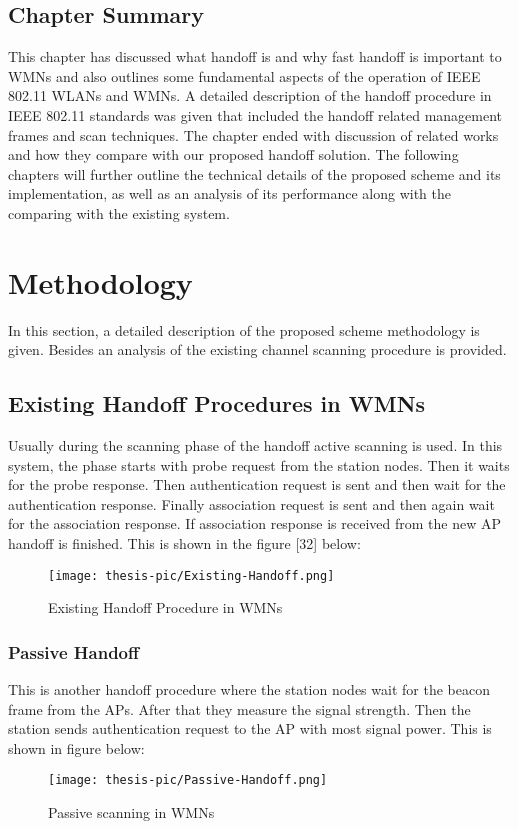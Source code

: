 \documentclass[12pt,a4paper]{report}
\begin{document}
\section{Chapter Summary}
This chapter has discussed what handoff is and why fast handoff is important to WMNs and also outlines some fundamental aspects of the operation of IEEE 802.11 WLANs and WMNs. A detailed description of the handoff procedure in IEEE 802.11 standards was given that included the handoff related management frames and scan techniques. The chapter ended with discussion of related works and how they compare with our proposed handoff solution. The following chapters will further outline the technical details of the proposed scheme and its implementation, as well as an analysis of its performance along with the comparing with the existing system.



\chapter{Methodology}
In this section, a detailed description of the proposed scheme methodology is given. Besides an analysis of the existing channel scanning procedure is provided.

\section{Existing Handoff Procedures in WMNs}
Usually during the scanning phase of the handoff active scanning is used. In this system, the phase starts with probe request from the station nodes. Then it waits for the probe response. Then authentication request is sent and then wait for the authentication response. Finally association request is sent and then again wait for the association response. If association response is received from the new AP handoff is finished.
This is shown in the figure [32] below:
\begin{figure}[H]
\texttt{[image: thesis-pic/Existing-Handoff.png]}
\caption{Existing Handoff Procedure in WMNs}
\end{figure}


\subsection{Passive Handoff}
This is another handoff procedure where the station nodes wait for the beacon frame from the APs. After that they measure the signal strength. Then the station sends authentication request to the AP with most signal power. This is shown in figure below:
\begin{figure}[H]
\texttt{[image: thesis-pic/Passive-Handoff.png]}
\caption{Passive scanning in WMNs}
\end{figure}
\end{document}
